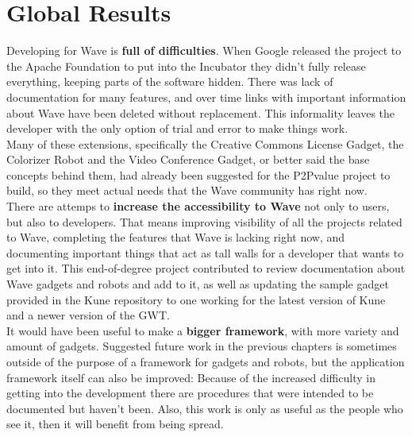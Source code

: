 \newpage
\section{Global Results}

Developing for Wave is \textbf{full of difficulties}. When Google released the project to the Apache Foundation to put into the Incubator they didn't fully release everything, keeping parts of the software hidden. There was lack of documentation for many features, and over time links with important information about Wave have been deleted without replacement. This informality leaves the developer with the only option of trial and error to make things work.\\[.2cm]
Many of these extensions, specifically the Creative Commons License Gadget, the Colorizer Robot and the Video Conference Gadget, or better said the base concepts behind them, had already been suggested for the P2Pvalue project to build, so they meet actual needs that the Wave community has right now.\\[.2cm]
There are attemps to \textbf{increase the accessibility to Wave} not only to users, but also to developers. That means improving visibility of all the projects related to Wave, completing the features that Wave is lacking right now, and documenting important things that act as tall walls for a developer that wants to get into it. This end-of-degree project contributed to review documentation about Wave gadgets and robots and add to it, as well as updating the sample gadget provided in the Kune repository to one working for the latest version of Kune and a newer version of the GWT.\\[.2cm]
It would have been useful to make a \textbf{bigger framework}, with more variety and amount of gadgets. Suggested future work in the previous chapters is sometimes outside of the purpose of a framework for gadgets and robots, but the application framework itself can also be improved: Because of the increased difficulty in getting into the development there are procedures that were intended to be documented but haven't been. Also, this work is only as useful as the people who see it, then it will benefit from being spread.
